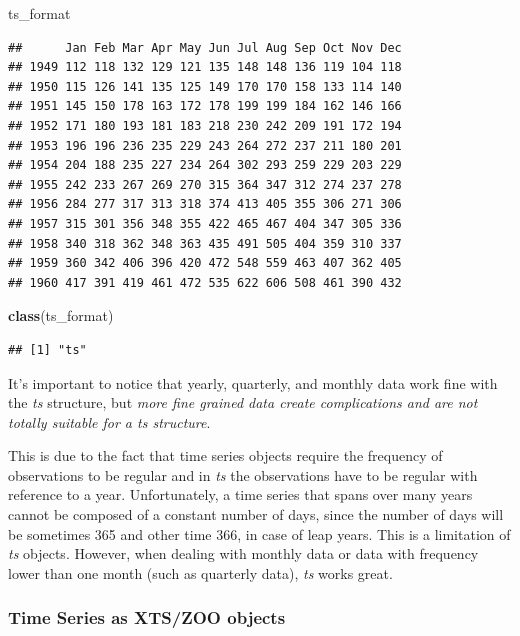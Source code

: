 \documentclass[
]{article}
\newenvironment{Shaded}{\begin{snugshade}}{\end{snugshade}}
\newcommand{\KeywordTok}[1]{\textcolor[rgb]{0.13,0.29,0.53}{\textbf{#1}}}
\newcommand{\NormalTok}[1]{#1}
\begin{document}
\begin{Shaded}
\begin{Highlighting}[]
\NormalTok{ts_format}
\end{Highlighting}
\end{Shaded}

\begin{verbatim}
##      Jan Feb Mar Apr May Jun Jul Aug Sep Oct Nov Dec
## 1949 112 118 132 129 121 135 148 148 136 119 104 118
## 1950 115 126 141 135 125 149 170 170 158 133 114 140
## 1951 145 150 178 163 172 178 199 199 184 162 146 166
## 1952 171 180 193 181 183 218 230 242 209 191 172 194
## 1953 196 196 236 235 229 243 264 272 237 211 180 201
## 1954 204 188 235 227 234 264 302 293 259 229 203 229
## 1955 242 233 267 269 270 315 364 347 312 274 237 278
## 1956 284 277 317 313 318 374 413 405 355 306 271 306
## 1957 315 301 356 348 355 422 465 467 404 347 305 336
## 1958 340 318 362 348 363 435 491 505 404 359 310 337
## 1959 360 342 406 396 420 472 548 559 463 407 362 405
## 1960 417 391 419 461 472 535 622 606 508 461 390 432
\end{verbatim}

\begin{Shaded}
\begin{Highlighting}[]
\KeywordTok{class}\NormalTok{(ts_format)}
\end{Highlighting}
\end{Shaded}

\begin{verbatim}
## [1] "ts"
\end{verbatim}

It's important to notice that yearly, quarterly, and monthly data work fine with the \emph{ts} structure, but \emph{more fine grained data create complications and are not totally suitable for a ts structure}.

This is due to the fact that time series objects require the frequency of observations to be regular and in \emph{ts} the observations have to be regular with reference to a year. Unfortunately, a time series that spans over many years cannot be composed of a constant number of days, since the number of days will be sometimes 365 and other time 366, in case of leap years. This is a limitation of \emph{ts} objects. However, when dealing with monthly data or data with frequency lower than one month (such as quarterly data), \emph{ts} works great.

\hypertarget{time-series-as-xtszoo-objects}{%
\subsubsection{Time Series as XTS/ZOO objects}\label{time-series-as-xtszoo-objects}}
\end{document}
